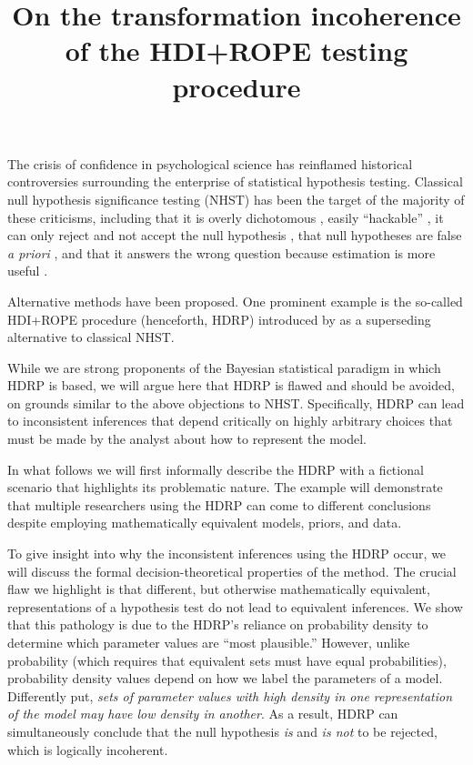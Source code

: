 \documentclass[man]{apa}
\title{On the transformation incoherence of the HDI+ROPE testing procedure}
\newcommand{\hdr}{HDRP}
\newcommand{\jv}[1]{\todo[inline,color=lime]{#1 -\textit{jv}}}
\begin{document}
\maketitle

\noindent The crisis of confidence in psychological science has reinflamed historical controversies surrounding the enterprise of statistical hypothesis testing.  Classical null hypothesis significance testing (NHST) has been the target of the majority of these criticisms, including that it is overly dichotomous \cite{gibson2021}, easily ``hackable'' \cite{SimmonsEtAl2011}, it can only reject and not accept the null hypothesis \cite{Rouder2009ttest}, that null hypotheses are false \textit{a priori} \cite{Cohen1994,mcshane2019}, and that it answers the wrong question because estimation is more useful \cite{Cumming2014}. 
\jv{This is a note.}

Alternative methods have been proposed. One prominent example is the so-called HDI+ROPE procedure (henceforth, \hdr{}) introduced by  as a superseding alternative to classical NHST.  

While we are strong proponents of the Bayesian statistical paradigm \cite{EtzSI,Vandekerckhove2018} in which \hdr{} is based, we will argue here that \hdr{} is flawed and should be avoided, on grounds similar to the above objections to NHST.  Specifically, \hdr{} can lead to inconsistent inferences that depend critically on highly arbitrary choices that must be made by the analyst about how to represent the model. 

In what follows we will first informally describe the \hdr{} with a fictional scenario that highlights its problematic nature. The example will demonstrate that multiple researchers using the \hdr{} can come to different conclusions despite employing mathematically equivalent models, priors, and data. 

To give insight into why the inconsistent inferences using the \hdr{} occur, we will discuss the formal decision-theoretical properties of the method. The crucial flaw we highlight is that different, but otherwise mathematically equivalent, representations of a hypothesis test do not lead to equivalent inferences. We show that this pathology is due to the \hdr{}'s reliance on probability density to determine which parameter values are ``most plausible.'' However, unlike probability (which requires that equivalent sets must have equal probabilities), probability density values depend on how we label the parameters of a model.  Differently put, \textit{sets of parameter values with high density in one representation of the model may have low density in another}. As a result, \hdr{} can simultaneously conclude that the null hypothesis \textit{is} and \textit{is not} to be rejected, which is logically incoherent.
\end{document}
